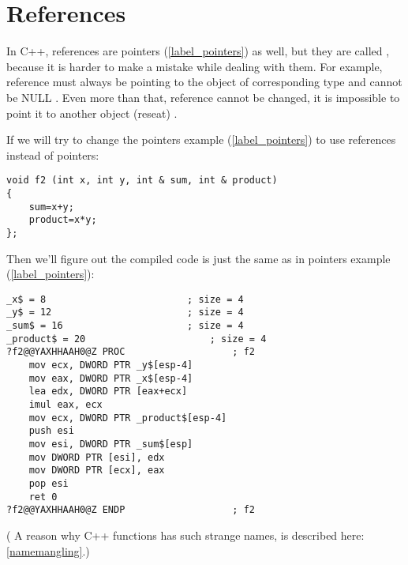 \section{References}
\label{cpp_references}

{In C++, references are pointers (\ref{label_pointers}) as well, but they are called , because it is harder to make a mistake while
dealing with them}\cite[8.3.2]{CPP11}.
{For example, reference must always be pointing to the object of corresponding type and cannot be NULL}
\cite[8.6]{ParashiftCPPFAQ}.
{Even more than that, reference cannot be changed, it is impossible to point it to another object (reseat)}
\cite[8.5]{ParashiftCPPFAQ}.

{If we will try to change the pointers example (\ref{label_pointers}) to use references instead of pointers:}

\begin{lstlisting}
void f2 (int x, int y, int & sum, int & product)
{
	sum=x+y;
	product=x*y;
};
\end{lstlisting}

{Then we'll figure out the compiled code is just the same 
as in pointers example (\ref{label_pointers}):}

\begin{lstlisting}[caption=\Optimizing MSVC 2010]
_x$ = 8							; size = 4
_y$ = 12						; size = 4
_sum$ = 16						; size = 4
_product$ = 20						; size = 4
?f2@@YAXHHAAH0@Z PROC					; f2
	mov	ecx, DWORD PTR _y$[esp-4]
	mov	eax, DWORD PTR _x$[esp-4]
	lea	edx, DWORD PTR [eax+ecx]
	imul eax, ecx
	mov ecx, DWORD PTR _product$[esp-4]
	push esi
	mov	esi, DWORD PTR _sum$[esp]
	mov	DWORD PTR [esi], edx
	mov	DWORD PTR [ecx], eax
	pop	esi
	ret	0
?f2@@YAXHHAAH0@Z ENDP					; f2
\end{lstlisting}

(
{A reason why C++ functions has such strange names, is described here}: \ref{namemangling}.)
